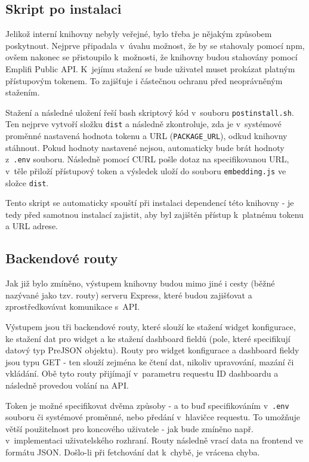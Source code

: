 \documentclass[czech, bc, kiv, he, iso690numb]{fasthesis}
\begin{document}
\subsection{Skript po instalaci}

Jelikož interní knihovny nebyly veřejné, bylo třeba je nějakým způsobem poskytnout. Nejprve připadala v~úvahu možnost, že by se stahovaly pomocí npm, ovšem
nakonec se přistoupilo k~možnosti, že knihovny budou stahovány pomocí Emplifi Public API. K~jejímu stažení se bude uživatel muset prokázat platným přístupovým tokenem.
To zajišťuje i částečnou ochranu před neoprávněným stažením.

Stažení a následné uložení řeší bash skriptový kód v~souboru \texttt{postinstall.sh}. Ten nejprve vytvoří složku \texttt{dist} a následně zkontroluje, zda je v~systémové proměnné
nastavená hodnota tokenu a URL (\texttt{PACKAGE\_URL}), odkud knihovny stáhnout. Pokud hodnoty nastavené nejsou, automaticky bude brát hodnoty z~\texttt{.env} souboru. Následně pomocí CURL pošle dotaz na
specifikovanou URL, v~těle přiloží přístupový token a výsledek uloží do souboru \texttt{embedding.js} ve složce \texttt{dist}.

Tento skript se automaticky spouští při instalaci dependencí této knihovny - je tedy před samotnou instalací zajistit, aby byl zajištěn přístup k~platnému tokenu a URL adrese.

\subsection{Backendové routy}

Jak již bylo zmíněno, výstupem knihovny budou mimo jiné i cesty (běžné nazývané jako tzv. routy) serveru Express, které budou zajišťovat a zprostředkovávat komunikace s~API.

Výstupem jsou tři backendové routy, které slouží ke stažení widget konfigurace, ke stažení dat pro widget a ke stažení dashboard fieldů (pole, které specifikují datový typ PreJSON objektu).
Routy pro widget konfigurace a dashboard fieldy jsou typu GET - ten slouží zejména ke čtení dat, nikoliv upravování, mazání či vkládání. Obě tyto routy přijímají v~parametru requestu ID
dashboardu a následně provedou volání na API. 

Token je možné specifikovat dvěma způsoby - a to buď specifikováním v~\texttt{.env} souboru či systémové proměnné, nebo předání v~hlavičce requestu. To umožňuje větší použitelnost pro koncového
uživatele - jak bude zmíněno např. v~implementaci uživatelského rozhraní. Routy následně vrací data na frontend ve formátu JSON. Došlo-li při fetchování dat k~chybě, je vrácena chyba.
\end{document}
